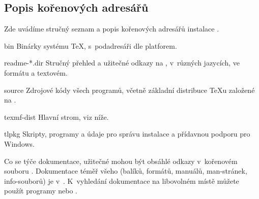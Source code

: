 \documentclass[\classoptions,slovak,english,czech]{\classname}
\begin{document}
\subsection{Popis kořenových adresářů \protect\TL{}}
\label{sec:tld}

Zde uvádíme stručný seznam a popis kořenových adresářů instalace \TL{}. 

\begin{ttdescription}
\item[bin] Binárky systému \TeX{}, s~podadresáři dle platforem.
%
\item[readme-*.dir] Stručný přehled a užitečné odkazy 
na \TL{}, v~různých jazycích, ve formátu \HTML{} a textovém.
%
\item[source] Zdrojové kódy všech programů, včetně základní distribuce
   \TeX{}u založené na \Webc{}.
%
\item[texmf-dist] Hlavní strom, viz  níže.
%
\item[tlpkg] Skripty, programy a údaje pro správu instalace a  
přídavnou podporu pro Windows.
\end{ttdescription}

\smallskip

Co se týče dokumentace, užitečné mohou 
být obsáhlé odkazy v~kořenovém souboru .
Dokumentace téměř všeho (balíků, formátů, manuálů, man-stránek, info-souborů) 
je v~.
K~vyhledání dokumentace na libovolném místě můžete 
použít programy  nebo . 
\end{document}
